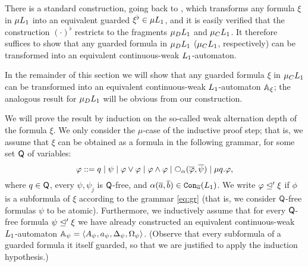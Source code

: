 There is a standard construction, going back to \cite{Koz83}, which transforms
any formula $\xi$ in $\mu L_{1}$ into an equivalent guarded $\xi^\flat \in 
\mu L_{1}$, and it is easily verified that the construction $(\cdot)^{\flat}$
restricts to the fragments $\mu_{D}L_{1}$ and $\mu_{C}L_{1}$.
It therefore suffices to show that any guarded formula in $\mu_{D}L_{1}$
($\mu_{C}L_{1}$, respectively) can be transformed into an equivalent
continuous-weak $L_{1}$-automaton.

In the remainder of this section we will show that any guarded formula $\xi$ 
in $\mu_{C}L_{1}$ can be transformed into an equivalent continuous-weak 
$L_{1}$-automaton $\mathbb{A}_{\xi}$; the analogous result for $\mu_{D}L_{1}$ will
be obvious from our construction.

We will prove the result by induction on the so-called weak alternation depth
of the formula $\xi$.
We only consider the $\mu$-case of the inductive proof step; that is, we 
assume that $\xi$ can be obtained as a formula in the following grammar, for 
some set $\mathsf{Q}$ of variables:
\begin{equation}
\label{eq:gr}
\phi \isbnf 
   q \mid \psi \mid \phi\lor\phi \mid \phi\land\phi \mid
   \nxt{\al}(\ol{\phi},\ol{\psi}) \mid \mu q. \phi,
\end{equation}
where $q \in \mathsf{Q}$, every $\psi,\psi_{j}$ is $\mathsf{Q}$-free, and 
$\alpha(\overline{a},\overline{b}) \in \mathtt{Con}_{\overline{a}}(L_{1})$.
We write $\varphi \trianglelefteq' \xi$ if $\phi$ is a subformula of $\xi$ according to 
the grammar \eqref{eq:gr} (that is, we consider $\mathsf{Q}$-free formulas $\psi$
to be atomic).
Furthermore, we inductively assume that for every $\mathsf{Q}$-free formula $\psi
\trianglelefteq' \xi$ we have already constructed an equivalent continuous-weak 
$L_{1}$-automaton $\mathbb{A}_{\psi} = \langle{A_{\psi},a_{\psi},\Delta_{\psi},
\Omega_{\psi}}\rangle$.
(Observe that every subformula of a guarded formula it itself guarded, so that 
we are justified to apply the induction hypothesis.)

